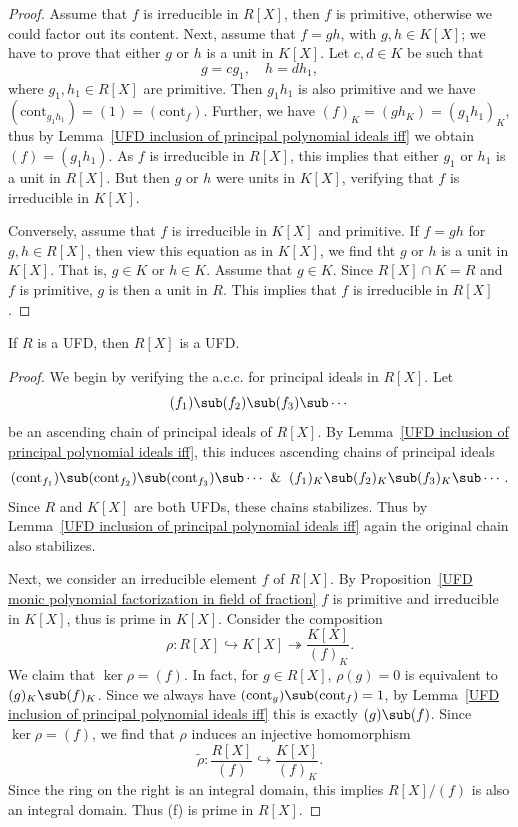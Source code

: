 \begin{proof}
Assume that $f$ is irreducible in $R[X]$, then $f$ is primitive, otherwise we could factor out its content. Next, assume that $f=gh$, with $g,h\in K[X]$; we have to prove that either $g$ or $h$ is a unit in $K[X]$. Let $c,d\in K$ be such that
\[g=cg_1,\quad h=dh_1,\]
where $g_1,h_1\in R[X]$ are primitive. Then $g_1h_1$ is also primitive and we have $(\mathrm{cont}_{g_1h_1})=(1)=(\mathrm{cont}_f)$. Further, we have $(f)_K=(gh_K)=(g_1h_1)_K$, thus by Lemma~\ref{UFD inclusion of principal polynomial ideals iff} we obtain $(f)=(g_1h_1)$. As $f$ is irreducible in $R[X]$, this implies that either $g_1$ or $h_1$ is a unit in $R[X]$. But then $g$ or $h$ were units in $K[X]$, verifying that $f$ is irreducible in $K[X]$.\par
Conversely, assume that $f$ is irreducible in $K[X]$ and primitive. If $f=gh$ for $g,h\in R[X]$, then view this equation as in $K[X]$, we find tht $g$ or $h$ is a unit in $K[X]$. That is, $g\in K$ or $h\in K$. Assume that $g\in K$. Since $R[X]\cap K=R$ and $f$ is primitive, $g$ is then a unit in $R$. This implies that $f$ is irreducible in $R[X]$.
\end{proof}
\begin{theorem}
If $R$ is a UFD, then $R[X]$ is a UFD.
\end{theorem}
\begin{proof}
We begin by verifying the a.c.c. for principal ideals in $R[X]$. Let
\[(f_1)\sub(f_2)\sub(f_3)\sub\cdots\]
be an ascending chain of principal ideals of $R[X]$. By Lemma~\ref{UFD inclusion of principal polynomial ideals iff}, this induces ascending chains of principal ideals
\[(\mathrm{cont}_{f_1})\sub(\mathrm{cont}_{f_2})\sub(\mathrm{cont}_{f_3})\sub\cdots\And (f_1)_K\sub(f_2)_K\sub(f_3)_K\sub\cdots.\]
Since $R$ and $K[X]$ are both UFDs, these chains stabilizes. Thus by Lemma~\ref{UFD inclusion of principal polynomial ideals iff} again the original chain also stabilizes.\par
Next, we consider an irreducible element $f$ of $R[X]$. By Proposition~\ref{UFD monic polynomial factorization in field of fraction} $f$ is primitive and irreducible in $K[X]$, thus is prime in $K[X]$. Consider the composition
\[\rho:R[X]\hookrightarrow K[X]\twoheadrightarrow\frac{K[X]}{(f)_K}.\]
We claim that $\ker\rho=(f)$. In fact, for $g\in R[X]$, $\rho(g)=0$ is equivalent to $(g)_K\sub(f)_K$. Since we always have $(\mathrm{cont}_g)\sub(\mathrm{cont}_f)=1$, by Lemma~\ref{UFD inclusion of principal polynomial ideals iff} this is exactly $(g)\sub(f)$. Since $\ker\rho=(f)$, we find that $\rho$ induces an injective homomorphism
\[\tilde{\rho}:\frac{R[X]}{(f)}\hookrightarrow\frac{K[X]}{(f)_K}.\]
Since the ring on the right is an integral domain, this implies $R[X]/(f)$ is also an integral domain. Thus (f) is prime in $R[X]$.
\end{proof}

